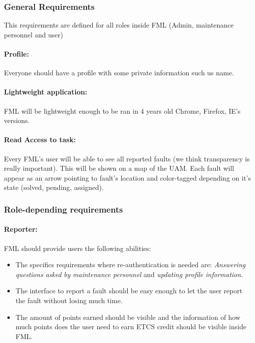 \subsubsection{General Requirements}

This requirements are defined for all roles inside FML (Admin, maintenance personnel and user)

\paragraph{Profile: } Everyone should have a profile with some private information such us name.

\paragraph{Lightweight application: } 
FML will be lightweight enough to be ran in  4 years old Chrome, Firefox, IE's versions. 

\paragraph{Read Access to task: } Every FML's user will be able to see all reported faults (we think transparency is really important). This will be shown on a map of the UAM. Each fault will appear as an arrow pointing to fault's location and color-tagged depending on it's state (solved, pending, assigned).

\subsubsection{Role-depending requirements}

\paragraph{Reporter: } FML should provide users the following abilities:
\begin{itemize}
\item The specifics requirements where re-authentication is needed are: \textit{Answering questions asked by maintenance personnel}   \label{Specifics_Secure_Requirements_for_user} and \textit{updating profile information}.
\item The interface to report a fault should be easy enough to let the user report the fault without losing much time.
\item The amount of points earned should be visible and the information of how much points does the user need to earn ETCS credit should be visible inside FML.

\end{itemize}
